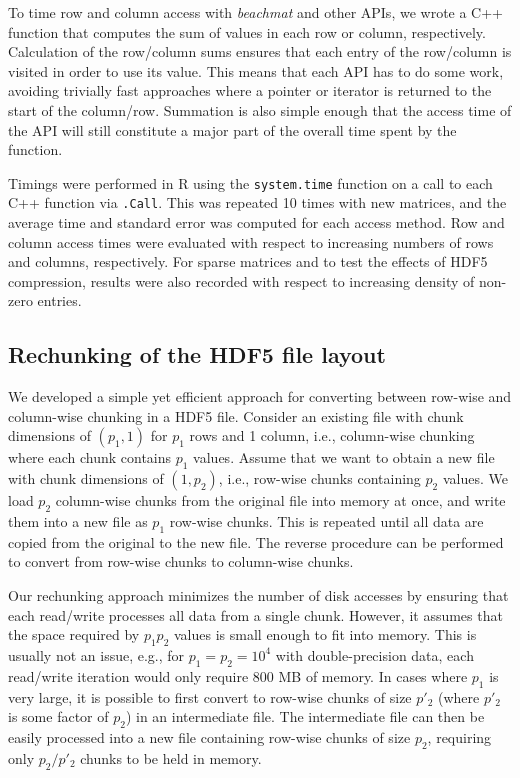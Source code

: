 \documentclass[10pt,letterpaper]{article}
\newcommand{\beachmat}{\textit{beachmat}}
\newcommand{\code}[1]{\texttt{#1}}
\begin{document}
To time row and column access with \beachmat{} and other APIs, we wrote a C++ function that computes the sum of values in each row or column, respectively.
Calculation of the row/column sums ensures that each entry of the row/column is visited in order to use its value.
This means that each API has to do some work, avoiding trivially fast approaches where a pointer or iterator is returned to the start of the column/row.
Summation is also simple enough that the access time of the API will still constitute a major part of the overall time spent by the function.

Timings were performed in R using the \code{system.time} function on a call to each C++ function via \code{.Call}. 
This was repeated 10 times with new matrices, and the average time and standard error was computed for each access method. 
Row and column access times were evaluated with respect to increasing numbers of rows and columns, respectively.
For sparse matrices and to test the effects of HDF5 compression, results were also recorded with respect to increasing density of non-zero entries.

\subsection*{Rechunking of the HDF5 file layout}
We developed a simple yet efficient approach for converting between row-wise and column-wise chunking in a HDF5 file.
Consider an existing file with chunk dimensions of $(p_1, 1)$ for $p_1$ rows and 1 column, i.e., column-wise chunking where each chunk contains $p_1$ values.
Assume that we want to obtain a new file with chunk dimensions of $(1, p_2)$, i.e., row-wise chunks containing $p_2$ values.
We load $p_2$ column-wise chunks from the original file into memory at once, and write them into a new file as $p_1$ row-wise chunks.
This is repeated until all data are copied from the original to the new file.
The reverse procedure can be performed to convert from row-wise chunks to column-wise chunks.

Our rechunking approach minimizes the number of disk accesses by ensuring that each read/write processes all data from a single chunk.
However, it assumes that the space required by $p_1p_2$ values is small enough to fit into memory. 
This is usually not an issue, e.g., for $p_1=p_2=10^4$ with double-precision data, each read/write iteration would only require 800 MB of memory.
In cases where $p_1$ is very large, it is possible to first convert to row-wise chunks of size $p'_2$ (where $p'_2$ is some factor of $p_2$) in an intermediate file.
The intermediate file can then be easily processed into a new file containing row-wise chunks of size $p_2$, requiring only $p_2/p'_2$ chunks to be held in memory.
\end{document}
